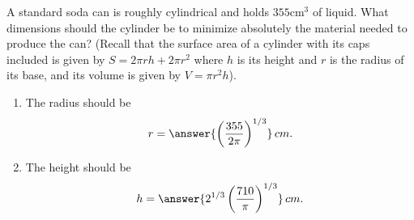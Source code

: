 \documentclass{ximera}
\author{Gregory Hartman \and Matthew Carr}
\begin{document}
\begin{exercise}



A standard soda can is roughly cylindrical and holds $355$cm$^3$ of liquid. What dimensions should the cylinder be to minimize absolutely the material needed to produce the can? (Recall that the surface area of a cylinder with its caps included is given by $S=2\pi r h+2\pi r^2$ where $h$ is its height and $r$ is the radius of its base, and its volume is given by $V=\pi r^2 h$).
\begin{prompt}
\begin{enumerate}
\item The radius should be \[r=\answer{\left(\frac{355}{2\pi}\right)^{1/3}}\,cm.\]
\item The height should be \[h=\answer{2^{1/3}\left(\frac{710}{\pi}\right)^{1/3}}\,cm.\]
\end{enumerate}
\end{prompt}
\end{exercise}
\end{document}

